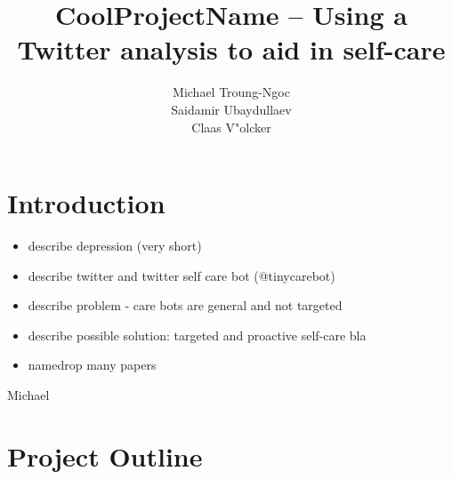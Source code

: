 \documentclass[colorback,accentcolor=tud9c]{tudreport}
\title{CoolProjectName -- Using a Twitter analysis to aid in self-care}
\subtitle{Michael Troung-Ngoc\\Saidamir Ubaydullaev\\Claas V"olcker}
\begin{document}
\maketitle

\tableofcontents

\chapter{Introduction}

\begin{itemize}
    \item describe depression (very short)
    \item describe twitter and twitter self care bot (@tinycarebot)
    \item describe problem - care bots are general and not targeted
    \item describe possible solution: targeted and proactive self-care bla
    \item namedrop many papers
\end{itemize}

Michael

\chapter{Project Outline}
\end{document}
